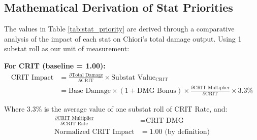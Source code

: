 \documentclass[12pt,a4paper]{article}
\begin{document}
\begin{table}[h]
\centering
{}
\caption{Relative stat values by constellation level and build configuration, normalised to CRIT-Rate = 1.00. Note the rise in DEF\% value and drop in ATK\% value as constellation level increases.}
\label{tab:stat_priority}
\end{table}
\subsection{Mathematical Derivation of Stat Priorities}

The values in Table \ref{tab:stat_priority} are derived through a comparative analysis of the impact of each stat on Chiori's total damage output. Using 1 substat roll as our unit of measurement:

\textbf{For CRIT (baseline = 1.00):}
\begin{align}
\text{CRIT Impact} &= \frac{\partial \text{Total Damage}}{\partial \text{CRIT}} \times \text{Substat Value}_{\text{CRIT}} \\
&= \text{Base Damage} \times (1 + \text{DMG Bonus}) \times \frac{\partial \text{CRIT Multiplier}}{\partial \text{CRIT}} \times 3.3\%
\end{align}

Where 3.3\% is the average value of one substat roll of CRIT Rate, and:
\begin{align}
\frac{\partial \text{CRIT Multiplier}}{\partial \text{CRIT Rate}} &= \text{CRIT DMG} \\
\text{Normalized CRIT Impact} &= 1.00 \text{ (by definition)}
\end{align}
\end{document}
